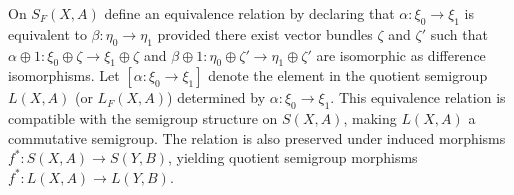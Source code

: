 On $S_F(X, A)$ define an equivalence relation by declaring that $\alpha: \xi_0 \rightarrow \xi_1$ is equivalent to $\beta: \eta_0 \rightarrow \eta_1$ provided there exist vector bundles $\zeta$ and $\zeta'$ such that $\alpha \oplus 1: \xi_0 \oplus \zeta \rightarrow \xi_1 \oplus \zeta$ and $\beta \oplus 1: \eta_0 \oplus \zeta' \rightarrow \eta_1 \oplus \zeta'$ are isomorphic as difference isomorphisms. Let $[\alpha: \xi_0 \rightarrow \xi_1]$ denote the element in the quotient semigroup $L(X, A)$ (or $L_F(X, A)$) determined by $\alpha: \xi_0 \rightarrow \xi_1$. This equivalence relation is compatible with the semigroup structure on $S(X, A)$, making $L(X, A)$ a commutative semigroup. The relation is also preserved under induced morphisms $f^*: S(X, A) \rightarrow S(Y, B)$, yielding quotient semigroup morphisms $f^*: L(X, A) \rightarrow L(Y, B)$.
